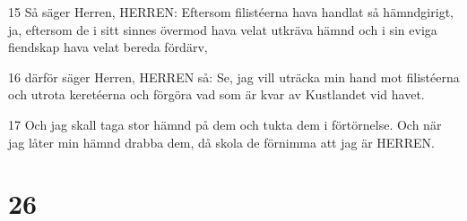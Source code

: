 \par 15 Så säger Herren, HERREN: Eftersom filistéerna hava handlat så hämndgirigt, ja, eftersom de i sitt sinnes övermod hava velat utkräva hämnd och i sin eviga fiendskap hava velat bereda fördärv,
\par 16 därför säger Herren, HERREN så: Se, jag vill uträcka min hand mot filistéerna och utrota keretéerna och förgöra vad som är kvar av Kustlandet vid havet.
\par 17 Och jag skall taga stor hämnd på dem och tukta dem i förtörnelse. Och när jag låter min hämnd drabba dem, då skola de förnimma att jag är HERREN.

\chapter{26}

